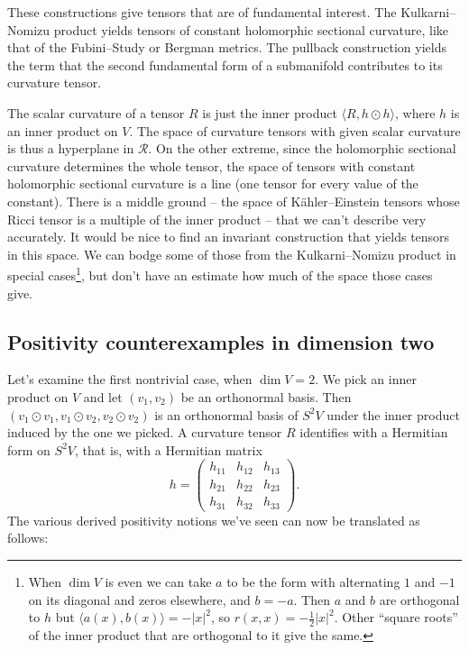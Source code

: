\documentclass[10pt,a4paper]{article}
\newcommand{\cc}[1]{\mathcal{#1}}
\begin{document}
These constructions give tensors that are of fundamental interest. The Kulkarni--Nomizu product yields tensors of constant holomorphic sectional curvature, like that of the Fubini--Study or Bergman metrics. The pullback construction yields the term that the second fundamental form of a submanifold contributes to its curvature tensor.



The scalar curvature of a tensor $R$ is just the inner product $\langle R, h \odot h \rangle$, where $h$ is an inner product on $V$. The space of curvature tensors with given scalar curvature is thus a hyperplane in $\cc R$. On the other extreme, since the holomorphic sectional curvature determines the whole tensor, the space of tensors with constant holomorphic sectional curvature is a line (one tensor for every value of the constant). There is a middle ground -- the space of K\"ahler--Einstein tensors whose Ricci tensor is a multiple of the inner product -- that we can't describe very accurately. It would be nice to find an invariant construction that yields tensors in this space. We can bodge some of those from the Kulkarni--Nomizu product in special cases\footnote{When $\dim V$ is even we can take $a$ to be the form with alternating $1$ and $-1$ on its diagonal and zeros elsewhere, and $b = -a$. Then $a$ and $b$ are orthogonal to $h$ but $\langle a(x), b(x) \rangle = - |x|^2$, so $r(x,x) = -\frac12 |x|^2$. Other ``square roots'' of the inner product that are orthogonal to it give the same.}, but don't have an estimate how much of the space those cases give.



\subsection{Positivity counterexamples in dimension two}

Let's examine the first nontrivial case, when $\dim V = 2$. We pick an inner product on $V$ and let $(v_1,v_2)$ be an orthonormal basis. Then $(v_1 \odot v_1, v_1 \odot v_2, v_2 \odot v_2)$ is an orthonormal basis of $S^2V$ under the inner product induced by the one we picked. A curvature tensor $R$ identifies with a Hermitian form on $S^2V$, that is, with a Hermitian matrix
$$
h = \begin{pmatrix}
  h_{11} & h_{12} & h_{13} \\
  h_{21} & h_{22} & h_{23} \\
  h_{31} & h_{32} & h_{33}
\end{pmatrix}.
$$
The various derived positivity notions we've seen can now be translated as follows:
\end{document}
